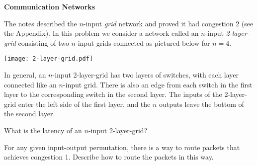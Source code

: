 \documentclass[12pt,oneside]{article}
\begin{document}
%
\begin{problem}[??] \textbf{Communication Networks}

  The notes described the $n$-input \emph{grid} network and proved it had
  congestion 2 (see the Appendix).  In this problem we consider a network
  called an $n$-input \emph{2-layer-grid} consisting of two $n$-input
  grids connected as pictured below for $n=4$.

\begin{center}
\texttt{[image: 2-layer-grid.pdf]}
\end{center}

In general, an $n$-input 2-layer-grid has two layers of switches, with
each layer connected like an $n$-input grid.  There is also an edge from
each switch in the first layer to the corresponding switch in the second
layer.  The inputs of the 2-layer-grid enter the left side of the first
layer, and the $n$ outputs leave the bottom of the second layer.

\bparts

\ppart[2] \; What is the latency of an $n$-input 2-layer-grid?
\brule{0.5in} 


\ppart[4] \; For any given input-output permutation, there is a way to route
packets that achieves congestion 1.  Describe how to route the packets in 
this way.



\eparts
\end{problem}
\end{document}
